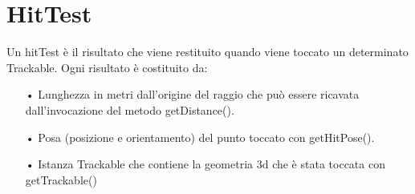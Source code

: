\documentclass[crop=false, class=book]{standalone}
\begin{document}
	\chapter{HitTest}
	
	Un hitTest è il risultato che viene restituito quando viene toccato un determinato Trackable.
	Ogni risultato è costituito da:
	\begin{itemize}
		\item[•] Lunghezza in metri dall'origine del raggio che può essere ricavata dall'invocazione del metodo getDistance().
		\item[•] Posa (posizione e orientamento) del punto toccato con getHitPose().
		\item[•] Istanza Trackable che contiene la geometria 3d che è stata toccata con getTrackable()
	\end{itemize}
	
\end{document}
